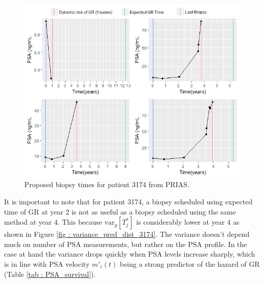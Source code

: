 \begin{figure}[!htb]
\centering
\captionsetup{justification=centering}
\includegraphics[width=\textwidth]{images/prias_demo/case_3174.png}
\caption{\label{fig : prias_demo_pid_3174} Proposed biopsy times for patient 3174 from PRIAS.}
\end{figure}

It is important to note that for patient 3174, a biopsy scheduled using expected time of GR at year 2 is not as useful as a biopsy scheduled using the same method at year 4. This because $\mbox{var}_g[T^*_j]$ is considerably lower at year 4 as shown in Figure \ref{fig : variance_pred_dist_3174}. The variance doesn't depend much on number of PSA measurements, but rather on the PSA profile. In the case at hand the variance drops quickly when PSA levels increase sharply, which is in line with PSA velocity $m'_i(t)$ being a strong predictor of the hazard of GR (Table \ref{tab : PSA_survival}).\\

